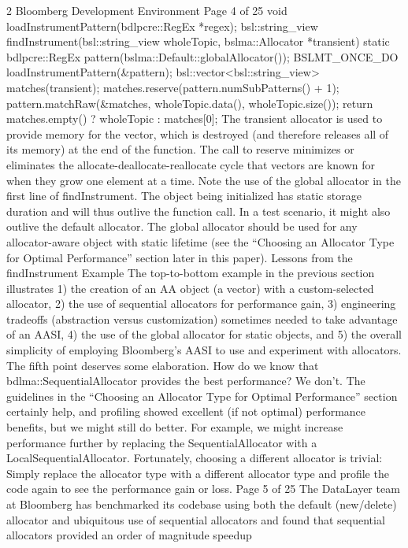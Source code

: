 2 Bloomberg Development Environment
Page 4 of 25
void loadInstrumentPattern(bdlpcre::RegEx *regex);
bsl::string_view findInstrument(bsl::string_view wholeTopic,
 bslma::Allocator *transient)
{
 static bdlpcre::RegEx pattern(bslma::Default::globalAllocator());
 BSLMT_ONCE_DO { loadInstrumentPattern(&pattern); }
 bsl::vector<bsl::string_view> matches(transient);
 matches.reserve(pattern.numSubPatterns() + 1);
 pattern.matchRaw(&matches, wholeTopic.data(), wholeTopic.size());
 return matches.empty() ? wholeTopic : matches[0];
}
The transient allocator is used to provide memory for the vector, which is
destroyed (and therefore releases all of its memory) at the end of the function.
The call to reserve minimizes or eliminates the allocate-deallocate-reallocate
cycle that vectors are known for when they grow one element at a time.
Note the use of the global allocator in the first line of findInstrument. The
object being initialized has static storage duration and will thus outlive the
function call. In a test scenario, it might also outlive the default allocator. The
global allocator should be used for any allocator-aware object with static
lifetime (see the “Choosing an Allocator Type for Optimal Performance” section
later in this paper).
Lessons from the findInstrument Example
The top-to-bottom example in the previous section illustrates
1) the creation of an AA object (a vector) with a custom-selected allocator,
2) the use of sequential allocators for performance gain,
3) engineering tradeoffs (abstraction versus customization) sometimes
needed to take advantage of an AASI,
4) the use of the global allocator for static objects, and
5) the overall simplicity of employing Bloomberg’s AASI to use and
experiment with allocators.
The fifth point deserves some elaboration. How do we know that
bdlma::SequentialAllocator provides the best performance? We don’t. The
guidelines in the “Choosing an Allocator Type for Optimal Performance” section
certainly help, and profiling showed excellent (if not optimal) performance
benefits, but we might still do better. For example, we might increase
performance further by replacing the SequentialAllocator with a
LocalSequentialAllocator. Fortunately, choosing a different allocator is trivial:
Simply replace the allocator type with a different allocator type and profile the
code again to see the performance gain or loss.
Page 5 of 25
The DataLayer team at Bloomberg has benchmarked its codebase using both
the default (new/delete) allocator and ubiquitous use of sequential allocators
and found that sequential allocators provided an order of magnitude speedup
